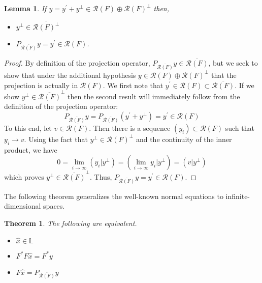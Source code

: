 \documentclass[12pt]{article}
\newcommand{\R}{\mathcal{R}}
\newtheorem{lemma}{Lemma}
\newtheorem{thm}{Theorem}
\begin{document}
\begin{lemma} \label{range_lemma}
If $y = y^\prime + y^\perp \in \R(F) \oplus \R(F)^\perp$ then, 
\begin{itemize} 
\item $y^\perp \in \overline{\R(F)^\perp}$
\item $P_{\overline{\R(F)}} y = y^\prime \in \R(F)$. 
\end{itemize} 
\end{lemma} 

\begin{proof} 
By definition of the projection operator, $P_{\overline{\R(F)}} y \in \overline{\R(F)}$, but we seek to show that under the 
additional hypothesis $y \in \R(F) \oplus \R(F)^\perp$ that the projection is actually in $\R(F)$. We first note that 
$y^\prime \in \R(F) \subset \overline{\R(F)}$. If we show $y^\perp \in \overline{\R(F)}^\perp$ then the second result will immediately 
follow from the definition of the projection operator: 
\[P_{\overline{\R(F)}} y = P_{\overline{\R(F)}} (y^\prime + y^\perp) = y^\prime \in \R(F)\]
To this end, let $v \in \overline{\R(F)}$. Then there is a sequence $(y_i) \subset \R(F)$ such that $y_i \to v$. Using
the fact that $y^\perp \in \R(F)^\perp$ and the continuity of the inner product, we have 
\[0 = \lim_{i \to \infty} (y_i|y^\perp) = (\lim_{i \to \infty} y_i|y^\perp) = (v|y^\perp)\]
which proves $y^\perp \in \overline{\R(F)}^\perp$. Thus, $P_{\overline{\R(F)}} y = y^\prime \in \R(F)$.
\end{proof} 

The following theorem generalizes the well-known normal equations to infinite-dimensional spaces. 

\begin{thm} \label{normal_equations}
The following are equivalent. 
\begin{itemize} 
\item $\hat{x} \in \mathbb{L}$
\item $F^* F\hat{x} = F^* y$
\item $F\hat{x} = P_{\overline{\R(F)}} y$
\end{itemize} 
\end{thm} 
\end{document}

